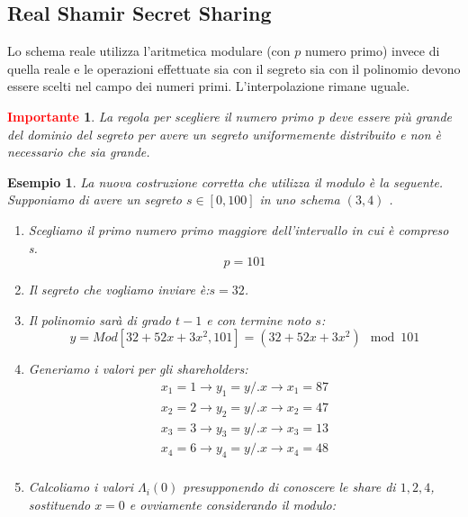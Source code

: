 \documentclass{book}
\newtheorem*{Importante}{\textbf{\textcolor{red}{Importante}}}
\newtheorem{esempio}{\textcolor{Grey1}{Esempio}}
\begin{document}
\subsection{Real Shamir Secret Sharing}
Lo schema reale utilizza l'aritmetica modulare (con \(p\) numero primo) invece di quella reale e  le operazioni effettuate sia con il segreto sia con il polinomio devono essere scelti nel campo dei numeri primi\@.\newline
L'interpolazione rimane uguale\@.
\begin{Importante}
	La regola per scegliere il numero primo p deve essere più grande del dominio del segreto per avere un segreto uniformemente distribuito e non è necessario che sia grande\@.
\end{Importante}
\begin{esempio}
	La nuova costruzione corretta che utilizza il modulo è la seguente\@.\newline
	Supponiamo di avere un segreto \(s\in[0,100]\) in uno schema \((3,4) \) \@.
	\begin{enumerate}
		\item Scegliamo il primo numero primo maggiore dell'intervallo in cui è compreso s\@.
		      \begin{equation*}
			      p=101
		      \end{equation*}
		\item Il segreto che vogliamo inviare è:\@ \(s=32\).
		\item Il polinomio sarà di grado \(t-1\) e con termine noto \(s\):\begin{equation*}
			      y=Mod[32+52x+3x^{2},101]=(32+52x+3x^{2})\mod{101}
		      \end{equation*}
		\item Generiamo i valori per gli shareholders:
		      \begin{equation*}
			      \begin{matrix}
				      x_{1}=1\rightarrow y_{1}=y/.{x\rightarrow x_{1}}=87 \\
				      x_{2}=2\rightarrow y_{2}=y/.{x\rightarrow x_{2}}=47 \\
				      x_{3}=3\rightarrow y_{3}=y/.{x\rightarrow x_{3}}=13 \\
				      x_{4}=6\rightarrow y_{4}=y/.{x\rightarrow x_{4}}=48 \\
			      \end{matrix}
		      \end{equation*}
		\item Calcoliamo i valori \(\Lambda_{i}(0) \) presupponendo di conoscere le share di \(1,2,4\), sostituendo \(x=0\) e ovviamente considerando il modulo:

\end{enumerate}
\end{esempio}
\end{document}
